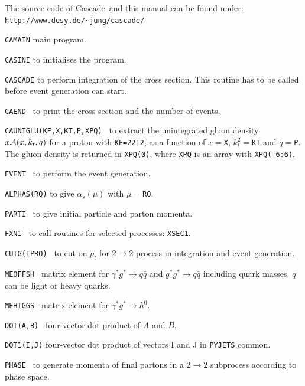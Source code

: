 \documentclass[11pt]{article} \usepackage{mystyle-new}
\newcommand{\deflab}[1]{#1\hfil}%
\newenvironment{defl}[1]%
  {\begin{list}{}{\settowidth{\labelwidth}{#1}%
  \setlength{\leftmargin}{\labelwidth}%
  \addtolength{\leftmargin}{\labelsep}%
  \setlength{\itemsep}{0pt plus 1pt}
  \setlength{\parsep}{0pt plus 1pt}
  \setlength{\topsep}{0pt plus 1pt}
  \setlength{\partopsep}{0pt plus 1pt}
  \setlength{\parskip}{2mm plus 1mm minus 1mm}
  \let\makelabel\deflab}}%
  {\end{list}}
\newcommand{\Pmax}{\bar{q}}
\def\CASCADE{{\sc Cascade}}
\begin{document}
The source code of \CASCADE\ and this manual can be found under:\\
\verb+http://www.desy.de/~jung/cascade/+

\begin{defl}{123456789012345}
\item[{\tt CAMAIN}]
                  main program.
\item[{\tt CASINI}] 
                   to initialises the program.
\item[{\tt CASCADE}]
     to perform integration of the cross section. This routine has to be
            called before event generation can start.
\item[{\tt CAEND }] 
           to print the cross section and the number of events.
\item[{\tt CAUNIGLU(KF,X,KT,P,XPQ) }]   
      to extract the unintegrated gluon density 
	$x {\cal A}(x,k_{t},\Pmax)$ for a proton with \verb+KF=2212+,
	as a function of $x=$\verb+X+, $k_{t}^2=$\verb+KT+ and $\Pmax=$\verb+P+.
      The gluon density is returned in \verb+XPQ(0)+, where \verb+XPQ+ is an 
      array with \verb+XPQ(-6:6)+.
\item[{\tt EVENT }] 
        to perform the event generation.
\item[{\tt ALPHAS(RQ)}] 
         to give $\alpha_s (\mu)$ with $\mu = $\verb+RQ+.
\item[{\tt PARTI }] 
         to give initial particle and parton momenta.
\item[{\tt FXN1 }] 
         to call routines for selected processes:
          \verb"XSEC1".
\item[{\tt CUTG(IPRO) }] 
          to cut on $p_t$ for $2 \to 2$ process 
          in integration and event generation.
\item[{\tt MEOFFSH }] 
          matrix element for 
	    $\gamma^* g^* \rightarrow q \bar{q}$  and
	    $g^* g^* \rightarrow q \bar{q}$ 
	    including quark masses. $q$ can be light or heavy quarks.
\item[{\tt MEHIGGS }] 
          matrix element for 
	    $\gamma^* g^* \rightarrow h^0$.
\item[{\tt DOT(A,B) }] 
         four-vector dot product of $A$ and $B$.
\item[{\tt DOT1(I,J)}]
          four-vector dot product of vectors I and J in
          \verb"PYJETS" common.
\item[{\tt PHASE }] 
         to generate momenta of final
         partons in a $2 \rightarrow 2$ subprocess according to phase space.	   

\end{defl}
\end{document}

